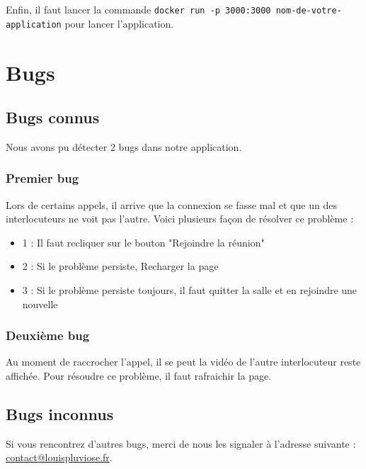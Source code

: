 \documentclass[12pt, a4paper, oneside]{thesis}
\begin{document}
Enfin, il faut lancer la commande \verb|docker run -p 3000:3000 nom-de-votre-application| pour lancer l'application.\\

\newpage

\section{Bugs}

\subsection{Bugs connus}

Nous avons pu détecter 2 bugs dans notre application.\\

\subsubsection{Premier bug}

Lors de certains appels, il arrive que la connexion se fasse mal et que un des interlocuteurs ne voit pas l'autre. Voici plusieurs façon de résolver ce problème :\\

\begin{itemize}
  \item 1 : Il faut recliquer sur le bouton "Rejoindre la réunion"
  \item 2 : Si le problème persiste, Recharger la page
  \item 3 : Si le problème persiste toujours, il faut quitter la salle et en rejoindre une nouvelle
\end{itemize}

\subsubsection{Deuxième bug}

Au moment de raccrocher l'appel, il se peut la vidéo de l'autre interlocuteur reste affichée. Pour résoudre ce problème, il faut rafraichir la page.\\

\subsection{Bugs inconnus}

Si vous rencontrez d'autres bugs, merci de nous les signaler à l'adresse suivante : \href{mailto:contact@louispluviose.fr}{contact@louispluviose.fr}.\\
\end{document}
